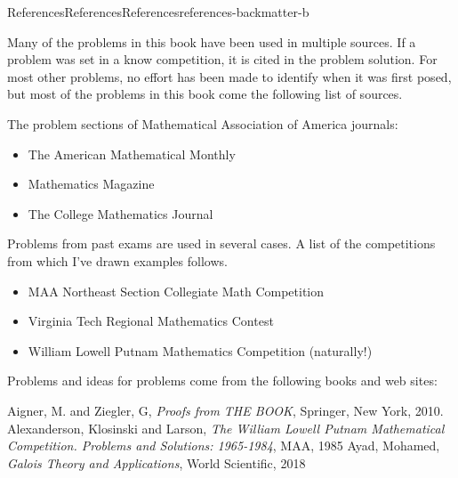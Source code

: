 \documentclass[oneside,10pt,]{book}
\numberwithin{equation}{section}
\providecommand\phantomsection{}
\begin{document}
%
\backmatter%
%
\clearpage\phantomsection%
%
%
%
\typeout{************************************************}
\typeout{************************************************}
%
\begin{references-chapter-numberless}{References}{References}{}{References}{}{}{references-backmatter-b}
%
\begin{introduction}{}%
Many of the problems in this book have been used in multiple sources.  If  a problem was set in a know competition, it is cited in the problem solution.   For most other problems, no effort has been made to identify when it was first posed, but most of the problems in this book come the following list of sources.%
\par
The problem sections of  Mathematical Association of America journals:%
\begin{itemize}[label=\textbullet]
\item{}The American Mathematical Monthly%
\item{}Mathematics Magazine%
\item{}The College Mathematics Journal%
\end{itemize}
%
\par
Problems from past exams are used in several cases.  A list of the competitions from which I've drawn examples follows.%
\begin{itemize}[label=\textbullet]
\item{}MAA Northeast Section Collegiate Math Competition%
\item{}Virginia Tech Regional Mathematics Contest%
\item{}William Lowell Putnam Mathematics Competition (naturally!)%
\end{itemize}
%
\par
Problems and ideas for problems come from the following books and web sites:%
\end{introduction}%
\begin{referencelist}
\hypertarget{biblio-biblio-aigner}{}Aigner, M. and Ziegler, G, \textit{Proofs from THE BOOK}, Springer, New York, 2010.
\hypertarget{biblio-biblio-putnam-2}{}Alexanderson, Klosinski and Larson, \textit{The William Lowell Putnam Mathematical Competition. Problems and Solutions: 1965-1984}, MAA, 1985
\hypertarget{biblio-biblio-ayad-2018}{}Ayad, Mohamed, \textit{Galois Theory and Applications}, World Scientific, 2018

\end{referencelist}
\end{references-chapter-numberless}
\end{document}
